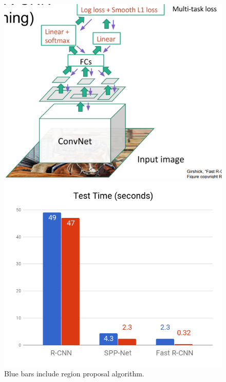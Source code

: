 \documentclass{article}
\begin{document}
\begin{figure}[htbp]
    \centering
    \begin{minipage}{0.5\textwidth}
        \centering
        \includegraphics[width=1\textwidth]{trainingfastrcnn.PNG} %
    \end{minipage}\hfill
    \begin{minipage}{0.5\textwidth}
        \centering
        \includegraphics[width=1\textwidth]{chart.png} %
        \caption{Blue bars include region proposal algorithm.}
    \end{minipage}
\end{figure}
\end{document}
